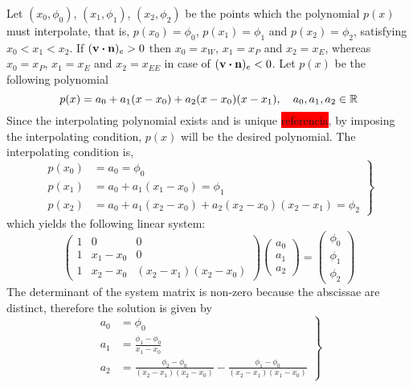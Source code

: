 \noindent
Let $(x_0, \phi_0)$, $(x_1, \phi_1)$, $(x_2, \phi_2)$ be the points which the polynomial $p(x)$ must interpolate, that is, $p(x_0) = \phi_0$, $p(x_1) = \phi_1$ and $p(x_2) = \phi_2$, satisfying $x_0 < x_1 < x_2$. If $(\vb{v} \vdot \vb{n})_e > 0$ then $x_0 = x_W$, $x_1 = x_P$ and $x_2 = x_E$, whereas $x_0 = x_P$, $x_1 = x_E$ and $x_2 = x_{EE}$ in case of $(\vb{v} \vdot \vb{n})_e < 0$. Let $p(x)$ be the following polynomial
\begin{equation}
	p(x) = a_0 + a_1 (x - x_0) + a_2 (x - x_0) (x - x_1), \quad a_0, a_1, a_2 \in \mathbb{R}
\end{equation}
Since the interpolating polynomial exists and is unique \colorbox{red}{referencia}, by imposing the interpolating condition, $p(x)$ will be the desired polynomial. The interpolating condition is,
\begin{equation}
	\left.
	\begin{aligned}
		p(x_0) &= a_0 = \phi_0 \\
		p(x_1) &= a_0 + a_1 (x_1 - x_0) = \phi_1 \\
		p(x_2) &= a_0 + a_1 (x_2 - x_0) + a_2 (x_2 - x_0) (x_2 - x_1) = \phi_2
	\end{aligned}	
	\right\}
\end{equation}
which yields the following linear system:
\begin{equation}
	\begin{pmatrix}
		1 & 0 & 0 \\
		1 & x_1 - x_0 & 0 \\
		1 & x_2 - x_0 & (x_2 - x_1)(x_2 - x_0)
	\end{pmatrix}
	\begin{pmatrix}
		a_0 \\ a_1 \\ a_2
	\end{pmatrix} = 
	\begin{pmatrix}
		\phi_0 \\ \phi_1 \\ \phi_2
	\end{pmatrix}
\end{equation}
The determinant of the system matrix is non-zero because the abscissae are distinct, therefore the solution is given by
\begin{equation}
	\left.
	\begin{aligned}
		a_0 &= \phi_0 \\
		a_1 &= \frac{\phi_1 - \phi_0}{x_1 - x_0} \\
		a_2 &= \frac{\phi_2 - \phi_0}{(x_2 - x_1)(x_2 - x_0)} - \frac{\phi_1 - \phi_0}{(x_2 - x_1)(x_1 - x_0)}
	\end{aligned}	
	\right\}
\end{equation}
